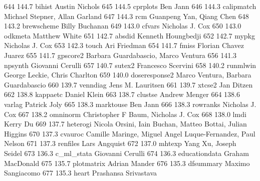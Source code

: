    644    144.7    bihist        Austin Nichols                          
   645    144.5    cprplots      Ben Jann                                
   646    144.3    calipmatch    Michael Stepner, Allan Garland          
   647    144.3    rcm           Guanpeng Yan, Qiang Chen                
   648    143.2    brewscheme    Billy Buchanan                          
   649    143.0    cfvars        Nicholas J. Cox                         
   650    143.0    odkmeta       Matthew White                           
   651    142.7    absdid        Kenneth Houngbedji                      
   652    142.7    mypkg         Nicholas J. Cox                         
   653    142.3    touch         Ari Friedman                            
   654    141.7    fmiss         Florian Chavez Juarez                   
   655    141.7    gpscore2      Barbara Guardabascio, Marco Ventura     
   656    141.3    npsynth       Giovanni Cerulli                        
   657    140.7    sutex2        Francesco Scervini                      
   658    140.2    runmlwin      George Leckie, Chris Charlton           
   659    140.0    doseresponse2  Marco Ventura, Barbara Guardabascio     
   660    139.7    venndiag      Jens M. Lauritsen                       
   661    139.7    xtcse2        Jan Ditzen                              
   662    138.8    kappaetc      Daniel Klein                            
   663    138.7    clustse       Andrew Menger                           
   664    138.6    varlag        Patrick Joly                            
   665    138.3    marktouse     Ben Jann                                
   666    138.3    rowranks      Nicholas J. Cox                         
   667    138.2    omninorm      Christopher F Baum, Nicholas J. Cox     
   668    138.0    lmdi          Kerry Du                                
   669    137.7    heterogi      Nicola Orsini, Iain Buchan, Matteo      
                                   Bottai, Julian Higgins                  
   670    137.3    cvauroc       Camille Maringe, Miguel Angel           
                                   Luque-Fernandez, Paul Nelson            
   671    137.3    renfiles      Lars Angquist                           
   672    137.0    mhtexp        Yang Xu, Joseph Seidel                  
   673    136.3    c_ml_stata    Giovanni Cerulli                        
   674    136.3    educationdata  Graham MacDonald                        
   675    135.7    plotmatrix    Adrian Mander                           
   676    135.3    dfsummary     Maximo Sangiacomo                       
   677    135.3    heart         Prashansa Srivastava                    
